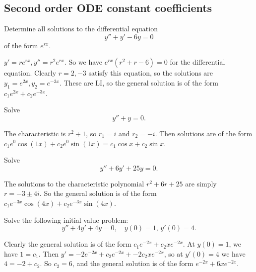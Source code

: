 \subsection{Second order ODE constant coefficients}
\begin{prob}
    Determine all solutions to the differential equation \[
    y''+y'-6y=0
    \] of the form $e^{rx}$.
\end{prob}
\begin{solution}
    $y'=re^{rx},y''=r^2e^{rx}$. So we have $e^{rx}(r^2+r-6)=0$ for the differential equation. Clearly $r=2,-3$ satisfy this equation, so the solutions are $y_1=e^{2x},y_2=e^{-3x}$. These are LI, so the general solution is of the form $c_1e^{2x}+c_2e^{-3x}$.
\end{solution}
\begin{prob}
    Solve \[
    y''+y=0.
    \] 
\end{prob}
\begin{solution}
    The characteristic is $r^2+1$, so $r_1=i$ and $r_2=-i$. Then solutions are of the form $c_1e^{0}\cos(1x)+c_2e^{0}\sin(1x)=c_1\cos x+c_2 \sin x$.
\end{solution}
\begin{prob}
    Solve \[
    y''+6y'+25y=0.
    \] 
\end{prob}
\begin{solution}
    The solutions to the characteristic polynomial $r^2+6r+25$ are simply $r=-3\pm 4i$. So the general solution is of the form $c_1e^{-3x}\cos(4x)+c_2e^{-3x}\sin(4x)$.
\end{solution}
\begin{prob}
    Solve the following initial value problem: \[
        y''+4y'+4y=0,\quad y(0)=1,\,y'(0)=4.
    \] 
\end{prob}
\begin{solution}
    Clearly the general solution is of the form $c_1e^{-2x}+c_2xe^{-2x}$. At $y(0)=1$, we have $1=c_1$. Then $y'=-2e^{-2x}+c_2e^{-2x}+-2c_2xe^{-2x}$, so at $y'(0)=4$ we have $4=-2+c_2$. So $c_2=6$, and the general solution is of the form $e^{-2x}+6xe^{-2x}$.
\end{solution}
